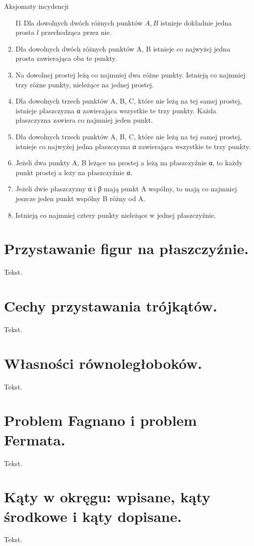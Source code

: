 \documentclass{parchment}
\begin{document}
Aksjomaty incydencji
\begin{enumerate}
	\item [I1] Dla dowolnych dwóch różnych punktów $A, B$ istnieje dokładnie jedna prosta $l$ przechodząca przez nie.
	\item Dla dowolnych dwóch różnych punktów A, B istnieje co najwyżej jedna prosta zawierająca oba te punkty.
	\item Na dowolnej prostej leżą co najmniej dwa różne punkty. Istnieją co najmniej trzy różne punkty, nieleżące na jednej prostej.
	\item Dla dowolnych trzech punktów A, B, C, które nie leżą na tej samej prostej, istnieje płaszczyzna α zawierająca wszystkie te trzy punkty. Każda płaszczyzna zawiera co najmniej jeden punkt.
	\item Dla dowolnych trzech punktów A, B, C, które nie leżą na tej samej prostej, istnieje co najwyżej jedna płaszczyzna α zawierająca wszystkie te trzy punkty.
	\item Jeżeli dwa punkty A, B leżące na prostej a leżą na płaszczyźnie α, to każdy punkt prostej a leży na płaszczyźnie α.
	\item Jeżeli dwie płaszczyzny α i β mają punkt A wspólny, to mają co najmniej jeszcze jeden punkt wspólny B różny od A.
	\item Istnieją co najmniej cztery punkty nieleżące w jednej płaszczyźnie.
\end{enumerate}

\section{Przystawanie figur na płaszczyźnie.}
Tekst.

\section{Cechy przystawania trójkątów.}
Tekst.

\section{Własności równoległoboków.}
Tekst.

\section{Problem Fagnano i problem Fermata.}
Tekst.

\section{Kąty w okręgu: wpisane, kąty środkowe i kąty dopisane.}
Tekst.
\end{document}
